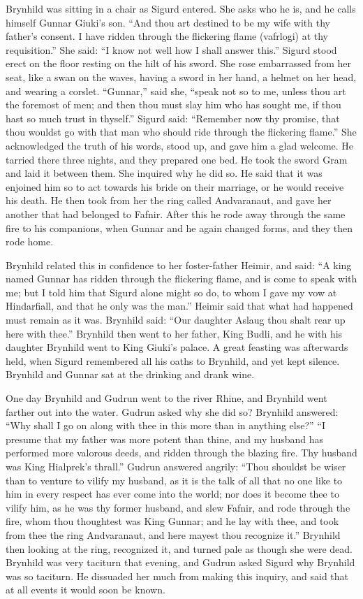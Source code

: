 Brynhild was sitting in a chair as Sigurd entered. She asks who he is,
and he calls himself Gunnar Giuki's son. ``And thou art destined to be
my wife with thy father's consent. I have ridden through the
flickering flame (vafrlogi) at thy requisition.'' She said: ``I know not
well how I shall answer this.'' Sigurd stood erect on the floor resting
on the hilt of his sword. She rose embarrassed from her seat, like a
swan on the waves, having a sword in her hand, a helmet on her head,
and wearing a corslet. ``Gunnar,'' said she, ``speak not so to me, unless
thou art the foremost of men; and then thou must slay him who has
sought me, if thou hast so much trust in thyself.'' Sigurd said:
``Remember now thy promise, that thou wouldst go with that man who
should ride through the flickering flame.'' She acknowledged the truth
of his words, stood up, and gave him a glad welcome. He tarried there
three nights, and they prepared one bed. He took the sword Gram and
laid it between them. She inquired why he did so. He said that it was
enjoined him so to act towards his bride on their marriage, or he
would receive his death. He then took from her the ring called
Andvaranaut, and gave her another that had belonged to Fafnir. After
this he rode away through the same fire to his companions, when Gunnar
and he again changed forms, and they then rode home.

Brynhild related this in confidence to her foster-father Heimir, and
said: ``A king named Gunnar has ridden through the flickering flame,
and is come to speak with me; but I told him that Sigurd alone might
so do, to whom I gave my vow at Hindarfiall, and that he only was the
man.'' Heimir said that what had happened must remain as it was.
Brynhild said: ``Our daughter Aslaug thou shalt rear up here with
thee.'' Brynhild then went to her father, King Budli, and he with his
daughter Brynhild went to King Giuki's palace. A great feasting was
afterwards held, when Sigurd remembered all his oaths to Brynhild, and
yet kept silence. Brynhild and Gunnar sat at the drinking and drank
wine.

One day Brynhild and Gudrun went to the river Rhine, and Brynhild went
farther out into the water. Gudrun asked why she did so? Brynhild
answered: ``Why shall I go on along with thee in this more than in
anything else?'' ``I presume that my father was more potent than thine,
and my husband has performed more valorous deeds, and ridden through
the blazing fire. Thy husband was King Hialprek's thrall.'' Gudrun
answered angrily: ``Thou shouldst be wiser than to venture to vilify my
husband, as it is the talk of all that no one like to him in every
respect has ever come into the world; nor does it become thee to
vilify him, as he was thy former husband, and slew Fafnir, and rode
through the fire, whom thou thoughtest was King Gunnar; and he lay
with thee, and took from thee the ring Andvaranaut, and here mayest
thou recognize it.'' Brynhild then looking at the ring, recognized it,
and turned pale as though she were dead. Brynhild was very taciturn
that evening, and Gudrun asked Sigurd why Brynhild was so taciturn. He
dissuaded her much from making this inquiry, and said that at all
events it would soon be known.


